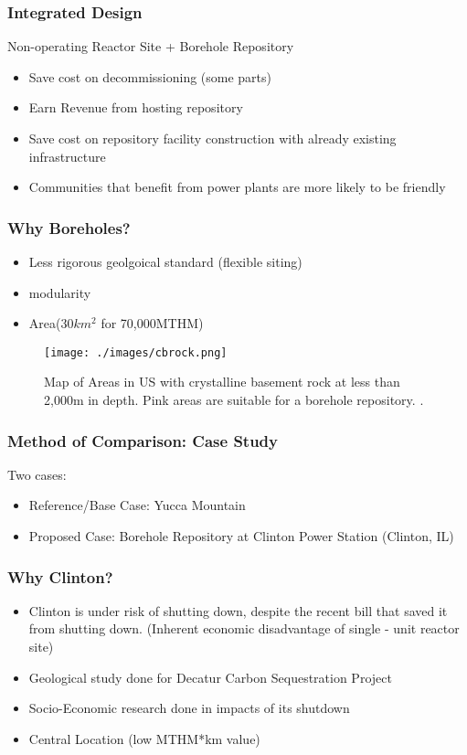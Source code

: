 	\begin{frame}
	\frametitle{Integrated Design}
	Non-operating Reactor Site + Borehole Repository
	\begin{itemize}
		\item Save cost on decommissioning (some parts)
		\item Earn Revenue from hosting repository
		\item Save cost on repository facility construction
			  with already existing infrastructure
		\item Communities that benefit from power plants are more likely
			  to be friendly
	\end{itemize}
\end{frame}

\begin{frame}
	\frametitle{Why Boreholes?}
	\begin{itemize}
		\item Less rigorous geolgoical standard (flexible siting)
		\item modularity
		\item Area(30$km^2$ for 70,000MTHM)
	\end{itemize}
	\begin{figure}[htbp!]
		\begin{center}
			\texttt{[image: ./images/cbrock.png]}
		\end{center}
		\caption{Map of Areas in US with crystalline basement rock at less than 2,000m in depth.
			Pink areas are suitable for a borehole repository.
			 \cite{freeze_siting_2015}.}
		\label{fig:basement_map}
	\end{figure}
\end{frame}

\begin{frame}
	\frametitle{Method of Comparison: Case Study}
	Two cases:
	\begin{itemize}
		\item Reference/Base Case: Yucca Mountain 
		\item Proposed Case: Borehole Repository at Clinton Power Station (Clinton, IL)
	\end{itemize}
\end{frame}

\begin{frame}
	\frametitle{Why Clinton?}
	\begin{itemize}
		\item Clinton is under risk of shutting down, despite the recent bill that saved it from shutting down. (Inherent economic disadvantage of single - unit reactor site)
		\item Geological study done for Decatur Carbon Sequestration Project
		\item Socio-Economic research done in impacts of its shutdown
		\item Central Location (low MTHM*km value)
	\end{itemize}
\end{frame}

